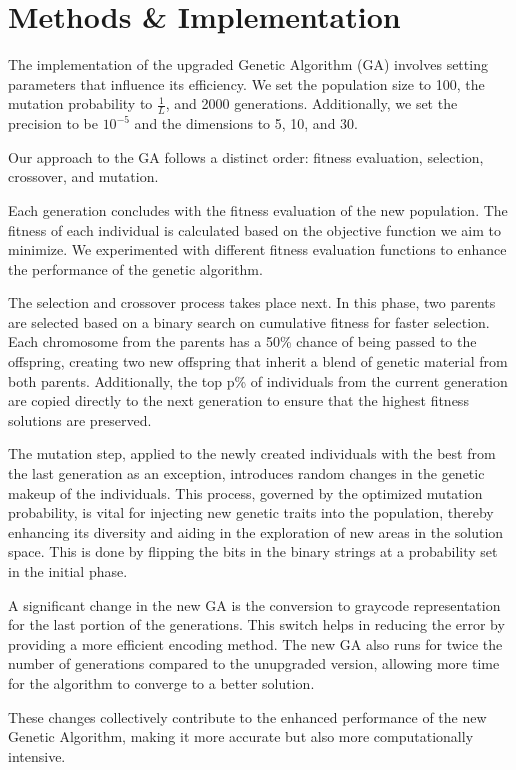 \documentclass{article}
\begin{document}
\section{Methods \& Implementation}

The implementation of the upgraded Genetic Algorithm (GA) involves setting parameters that influence its efficiency. We set the population size to 100, the mutation probability to $\frac{1}{L}$, and 2000 generations. Additionally, we set the precision to be $10^{-5}$ and the dimensions to 5, 10, and 30.

Our approach to the GA follows a distinct order: fitness evaluation, selection, crossover, and mutation.

Each generation concludes with the fitness evaluation of the new population. The fitness of each individual is calculated based on the objective function we aim to minimize. We experimented with different fitness evaluation functions to enhance the performance of the genetic algorithm.

The selection and crossover process takes place next. In this phase, two parents are selected based on a binary search on cumulative fitness for faster selection. Each chromosome from the parents has a 50\% chance of being passed to the offspring, creating two new offspring that inherit a blend of genetic material from both parents. Additionally, the top p\% of individuals from the current generation are copied directly to the next generation to ensure that the highest fitness solutions are preserved.

The mutation step, applied to the newly created individuals with the best from the last generation as an exception, introduces random changes in the genetic makeup of the individuals. This process, governed by the optimized mutation probability, is vital for injecting new genetic traits into the population, thereby enhancing its diversity and aiding in the exploration of new areas in the solution space. This is done by flipping the bits in the binary strings at a probability set in the initial phase.

A significant change in the new GA is the conversion to graycode representation for the last portion of the generations. This switch helps in reducing the error by providing a more efficient encoding method. The new GA also runs for twice the number of generations compared to the unupgraded version, allowing more time for the algorithm to converge to a better solution.

These changes collectively contribute to the enhanced performance of the new Genetic Algorithm, making it more accurate but also more computationally intensive.
\end{document}
